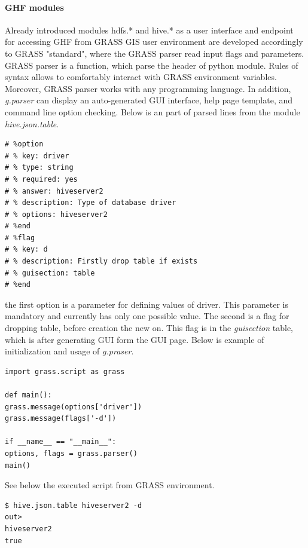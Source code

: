 \documentclass[a4paper,12pt,oneside]{report}
\begin{document}
	\paragraph{GHF modules}
	Already introduced modules hdfs.* and hive.* as a user interface and endpoint
	for accessing GHF from GRASS GIS user environment are developed accordingly to
	GRASS "standard", where the GRASS parser read input flags and parameters. GRASS
	parser is a function, which parse the header of python module.  Rules of syntax
	allows to comfortably interact with GRASS environment variables. Moreover, GRASS
	parser works with any programming language. In addition, \textit{g.parser} can display
	an auto-generated GUI interface, help page template, and command line option
	checking. 
	Below is an part of parsed lines from the module \textit{hive.json.table}.
	\begin{footnotesize}
		\begin{lstlisting}[style=python]
# %option
# % key: driver
# % type: string
# % required: yes
# % answer: hiveserver2
# % description: Type of database driver
# % options: hiveserver2
# %end
# %flag
# % key: d
# % description: Firstly drop table if exists
# % guisection: table
# %end
		\end{lstlisting}
	\end{footnotesize}
	the first option is a parameter for defining values of driver. This parameter is
	mandatory and currently has only one possible value. The second is a flag for
	dropping table, before creation the new on. This flag is in the
	\textit{guisection} table, which is after generating GUI form the GUI
	page. Below is example of initialization and usage of \textit{g.praser}.
	\begin{footnotesize}
		\begin{lstlisting}[style=python]
import grass.script as grass

def main():
grass.message(options['driver'])
grass.message(flags['-d'])

if __name__ == "__main__":
options, flags = grass.parser()
main()
		\end{lstlisting}
	\end{footnotesize}
	See below the executed script from GRASS environment.
	\begin{footnotesize}
		\begin{lstlisting}[style=python]
$ hive.json.table hiveserver2 -d
out> 
hiveserver2
true
		\end{lstlisting}
	\end{footnotesize}
	
\end{document}

